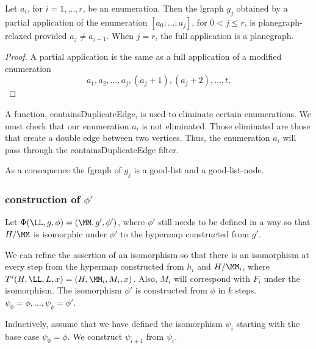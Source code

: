 \begin{lemma}  
Let $a_i$, for $i=1,\ldots,r$, be an enumeration.  
Then the lgraph $g_j$ obtained by a partial application of
the enumeration $[a_0;\ldots;a_j]$, for $0<j\le r$, is 
planegraph-relaxed provided $a_j \ne a_{j-1}$.
When $j=r$, the  full application is a planegraph.
\end{lemma} 

\begin{proof} A partial application is the same as a full application
of a modified enumeration
\[
a_1,a_2,\ldots,a_j,(a_j+1),(a_j+2),\ldots,t.
\]
\end{proof}

\begin{remark}
A function, containsDuplicateEdge, is used to eliminate certain
enumerations.  We must check that our enumeration $a_i$ is not
eliminated.  Those eliminated are those that create a double edge
between two vertices.  Thus, the enumeration $a_i$ will pass through
the containsDuplicateEdge filter.
\end{remark}

As a consequence the fgraph of $g_j$ is a good-list and a
good-list-node.

\subsubsection{construction of $\phi'$}

Let $\Phi(\LL,g,\phi) = (\MM,g',\phi')$, where $\phi'$ still
needs to be defined in a way so that $H/\MM$ is isomorphic
under $\phi'$ to the hypermap constructed from $g'$.

We can refine the assertion of an isomorphism so that there is an
isomorphism at every step from the hypermap constructed from $h_i$ and $H/\MM_i$, where $T^i(H,\LL,L,x) = (H,\MM_i,M_i,x)$.  Also, $M_i$ will
correspond with $F_i$ under the isomorphism.  The isomorphism $\phi'$
is constructed from $\phi$ in $k$ steps.  $\psi_0 = \phi,\ldots,\psi_k
= \phi'$.


Inductively, assume that we have defined the isomorphism $\psi_i$
starting with the base case $\psi_0=\phi$.  We construct $\psi_{i+1}$
from $\psi_i$.  

